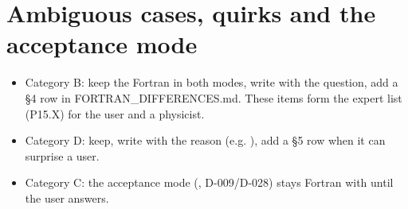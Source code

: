 \section{\texorpdfstring{Ambiguous cases, quirks and the acceptance mode}{Ambiguous cases, quirks and the acceptance mode}}\label{translation_report-05u5fcompat:54-ambiguous-cases-quirks-and-the-acceptance-mode}
\begin{itemize}
\item Category B: keep the Fortran in both modes, write  with the question, add a §4 row in
FORTRAN\_\allowbreak{}DIFFERENCES.md. These items form the expert list (P15.X) for the user and a physicist.
\item Category D: keep, write  with the reason (e.g. ), add a §5 row when it
can surprise a user.
\item Category C: the acceptance mode (, D-009/\allowbreak{}D-028) stays Fortran with  until the
user answers.
\end{itemize}
